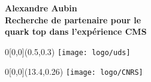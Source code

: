 \newpage
\singlespace
\thispagestyle{empty}
\begin{center}
\textbf{\Large{Alexandre Aubin}}\\
\textbf{\Large{Recherche de partenaire pour le\\
quark top dans l'expérience CMS}}
\end{center}
\begin{textblock}{0}[0,0](0.5,0.3)
{
    \setlength{\fboxsep}{0.7pt}
    \setlength{\fboxrule}{1pt}
    \texttt{[image: logo/uds]}
}
\end{textblock}
\begin{textblock}{0}[0,0](13.4,0.26)
{
    \setlength{\fboxsep}{0.7pt}
    \setlength{\fboxrule}{1pt}
    \texttt{[image: logo/CNRS]}
}
\end{textblock}
